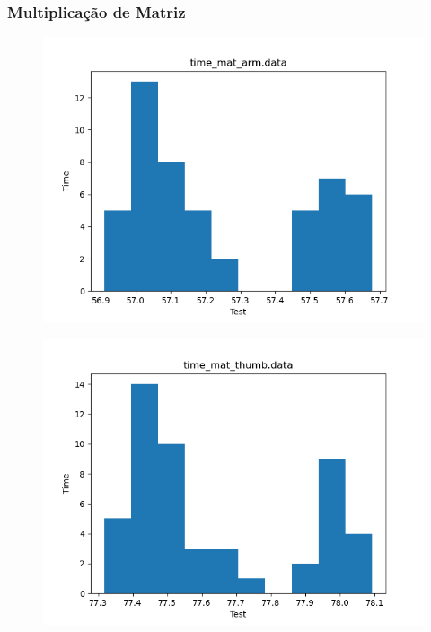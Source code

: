 \documentclass[a4paper,10pt]{article}
\begin{document}
\subsubsection*{Multiplicação de Matriz}
\begin{figure}[H]
 \includegraphics[width=\linewidth]{data/time_mat_arm_histogram.png}
\end{figure}

\begin{figure}[H]
 \includegraphics[width=\linewidth]{data/time_mat_thumb_histogram.png}
\end{figure}
\end{document}
